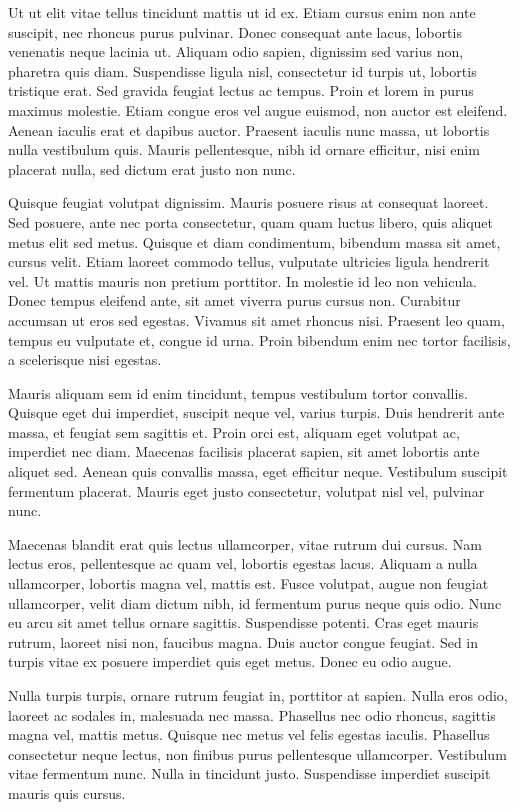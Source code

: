 \documentclass[aps,11pt, twocolumn]{revtex4-1}
\begin{document}
Ut ut elit vitae tellus tincidunt mattis ut id ex. Etiam cursus enim non ante suscipit, nec rhoncus purus pulvinar. Donec consequat ante lacus, lobortis venenatis neque lacinia ut. Aliquam odio sapien, dignissim sed varius non, pharetra quis diam. Suspendisse ligula nisl, consectetur id turpis ut, lobortis tristique erat. Sed gravida feugiat lectus ac tempus. Proin et lorem in purus maximus molestie. Etiam congue eros vel augue euismod, non auctor est eleifend. Aenean iaculis erat et dapibus auctor. Praesent iaculis nunc massa, ut lobortis nulla vestibulum quis. Mauris pellentesque, nibh id ornare efficitur, nisi enim placerat nulla, sed dictum erat justo non nunc.

Quisque feugiat volutpat dignissim. Mauris posuere risus at consequat laoreet. Sed posuere, ante nec porta consectetur, quam quam luctus libero, quis aliquet metus elit sed metus. Quisque et diam condimentum, bibendum massa sit amet, cursus velit. Etiam laoreet commodo tellus, vulputate ultricies ligula hendrerit vel. Ut mattis mauris non pretium porttitor. In molestie id leo non vehicula. Donec tempus eleifend ante, sit amet viverra purus cursus non. Curabitur accumsan ut eros sed egestas. Vivamus sit amet rhoncus nisi. Praesent leo quam, tempus eu vulputate et, congue id urna. Proin bibendum enim nec tortor facilisis, a scelerisque nisi egestas.

Mauris aliquam sem id enim tincidunt, tempus vestibulum tortor convallis. Quisque eget dui imperdiet, suscipit neque vel, varius turpis. Duis hendrerit ante massa, et feugiat sem sagittis et. Proin orci est, aliquam eget volutpat ac, imperdiet nec diam. Maecenas facilisis placerat sapien, sit amet lobortis ante aliquet sed. Aenean quis convallis massa, eget efficitur neque. Vestibulum suscipit fermentum placerat. Mauris eget justo consectetur, volutpat nisl vel, pulvinar nunc.

Maecenas blandit erat quis lectus ullamcorper, vitae rutrum dui cursus. Nam lectus eros, pellentesque ac quam vel, lobortis egestas lacus. Aliquam a nulla ullamcorper, lobortis magna vel, mattis est. Fusce volutpat, augue non feugiat ullamcorper, velit diam dictum nibh, id fermentum purus neque quis odio. Nunc eu arcu sit amet tellus ornare sagittis. Suspendisse potenti. Cras eget mauris rutrum, laoreet nisi non, faucibus magna. Duis auctor congue feugiat. Sed in turpis vitae ex posuere imperdiet quis eget metus. Donec eu odio augue.

Nulla turpis turpis, ornare rutrum feugiat in, porttitor at sapien. Nulla eros odio, laoreet ac sodales in, malesuada nec massa. Phasellus nec odio rhoncus, sagittis magna vel, mattis metus. Quisque nec metus vel felis egestas iaculis. Phasellus consectetur neque lectus, non finibus purus pellentesque ullamcorper. Vestibulum vitae fermentum nunc. Nulla in tincidunt justo. Suspendisse imperdiet suscipit mauris quis cursus.
\end{document}
